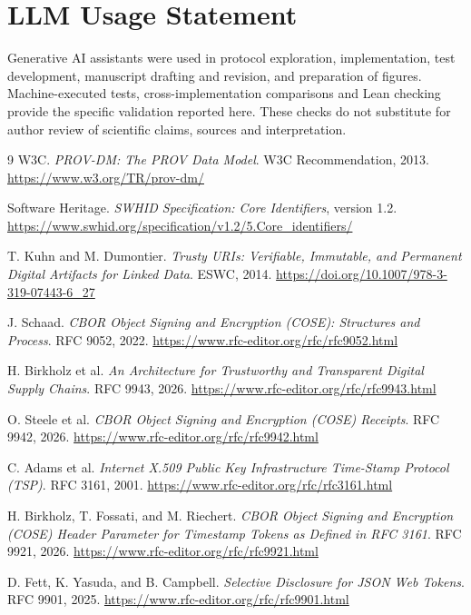 \documentclass[conference,compsoc]{IEEEtran}
\begin{document}
\ifdefined\ACSDACSAC
  \clearpage
\fi
\section*{LLM Usage Statement}
Generative AI assistants were used in protocol exploration, implementation,
test development, manuscript drafting and revision, and preparation of figures.
Machine-executed tests, cross-implementation comparisons and Lean checking
provide the specific validation reported here. These checks do not substitute
for author review of scientific claims, sources and interpretation.

\begin{thebibliography}{9}
W3C. \emph{PROV-DM: The PROV Data Model}. W3C Recommendation, 2013. \url{https://www.w3.org/TR/prov-dm/}

Software Heritage. \emph{SWHID Specification: Core Identifiers}, version 1.2. \url{https://www.swhid.org/specification/v1.2/5.Core_identifiers/}

T. Kuhn and M. Dumontier. \emph{Trusty URIs: Verifiable, Immutable, and Permanent Digital Artifacts for Linked Data}. ESWC, 2014. \url{https://doi.org/10.1007/978-3-319-07443-6_27}

J. Schaad. \emph{CBOR Object Signing and Encryption (COSE): Structures and Process}. RFC 9052, 2022. \url{https://www.rfc-editor.org/rfc/rfc9052.html}

H. Birkholz et al. \emph{An Architecture for Trustworthy and Transparent Digital Supply Chains}. RFC 9943, 2026. \url{https://www.rfc-editor.org/rfc/rfc9943.html}

O. Steele et al. \emph{CBOR Object Signing and Encryption (COSE) Receipts}. RFC 9942,
2026. \url{https://www.rfc-editor.org/rfc/rfc9942.html}

C. Adams et al. \emph{Internet X.509 Public Key Infrastructure Time-Stamp Protocol (TSP)}. RFC 3161, 2001. \url{https://www.rfc-editor.org/rfc/rfc3161.html}

H. Birkholz, T. Fossati, and M. Riechert. \emph{CBOR Object Signing and
Encryption (COSE) Header Parameter for Timestamp Tokens as Defined in RFC
3161}. RFC 9921, 2026. \url{https://www.rfc-editor.org/rfc/rfc9921.html}

D. Fett, K. Yasuda, and B. Campbell. \emph{Selective Disclosure for JSON Web Tokens}. RFC 9901, 2025. \url{https://www.rfc-editor.org/rfc/rfc9901.html}


\end{thebibliography}
\end{document}
